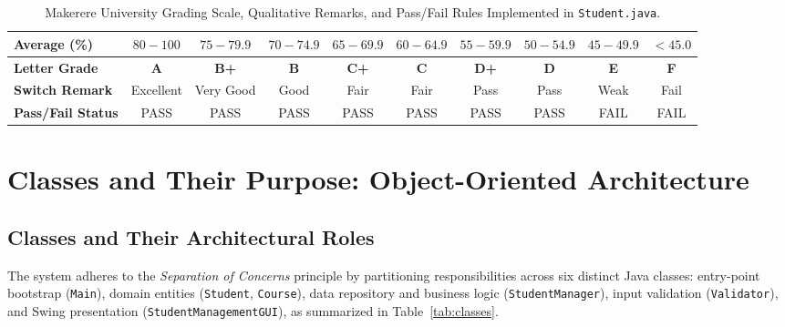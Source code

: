 \documentclass[10pt,a4paper]{article}
\begin{document}
\begin{table}[H]
\centering
\caption{Makerere University Grading Scale, Qualitative Remarks, and Pass/Fail Rules Implemented in \texttt{Student.java}.}
\label{tab:grading}
\footnotesize
\renewcommand{\arraystretch}{0.96}
\setlength{\tabcolsep}{4.8pt}
\begin{tabular}{@{}lccccccccc@{}}
\toprule
\textbf{Average (\%)} & $80-100$ & $75-79.9$ & $70-74.9$ & $65-69.9$ & $60-64.9$ & $55-59.9$ & $50-54.9$ & $45-49.9$ & $<45.0$ \\
\midrule
\textbf{Letter Grade} & \textbf{A} & \textbf{B+} & \textbf{B} & \textbf{C+} & \textbf{C} & \textbf{D+} & \textbf{D} & \textbf{E} & \textbf{F} \\
\textbf{Switch Remark} & Excellent & Very Good & Good & Fair & Fair & Pass & Pass & Weak & Fail \\
\textbf{Pass/Fail Status} & PASS & PASS & PASS & PASS & PASS & PASS & PASS & FAIL & FAIL \\
\bottomrule
\end{tabular}
\end{table}

\section{Classes and Their Purpose: Object-Oriented Architecture}

\subsection{Classes and Their Architectural Roles}
The system adheres to the \textit{Separation of Concerns} principle by partitioning responsibilities across six distinct Java classes: entry-point bootstrap (\texttt{Main}), domain entities (\texttt{Student}, \texttt{Course}), data repository and business logic (\texttt{StudentManager}), input validation (\texttt{Validator}), and Swing presentation (\texttt{StudentManagementGUI}), as summarized in Table~\ref{tab:classes}.
\end{document}

